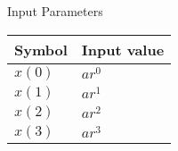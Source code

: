 \setlength{\arrayrulewidth}{0.3mm}
\setlength{\tabcolsep}{12pt}
\renewcommand{\arraystretch}{1.3}


\begin{center}
\caption{Input Parameters}
\begin{tabular}{ |p{2.0cm}|p{2.0cm}| }

\hline
 {Symbol}&{Input value}\\
\hline
$x(0)$ & $ar^0$ \\
\hline
$x(1) $ & $ar^1$ \\
\hline
$x(2)$ & $ar^2$ \\
\hline
$x(3)$ & $ar^3$ \\
\hline

\end{tabular}
\end{center}
